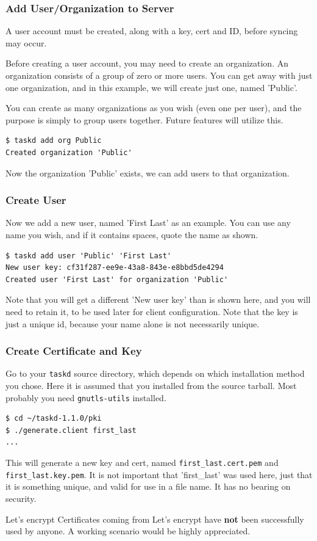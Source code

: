 \documentclass[t,handout]{beamer}
\begin{document}
\begin{frame}[fragile]\frametitle{Add User/Organization to Server}

    A user account must be created, along with a key, cert and ID, before syncing may occur.

    Before creating a user account, you may need to create an organization. An organization consists of a group of zero or more users. You can get away with just one organization, and in this example, we will create just one, named 'Public'.

    You can create as many organizations as you wish (even one per user), and the purpose is simply to group users together. Future features will utilize this.

    \begin{lstlisting}
$ taskd add org Public
Created organization 'Public'\end{lstlisting}

  Now the organization 'Public' exists, we can add users to that organization.
\end{frame}

\begin{frame}[fragile]\frametitle{Create User}
    \vfill
    Now we add a new user, named 'First Last' as an example.  You can use any name you wish, and if it contains spaces, quote the name as shown.

    \begin{lstlisting}
$ taskd add user 'Public' 'First Last'
New user key: cf31f287-ee9e-43a8-843e-e8bbd5de4294
Created user 'First Last' for organization 'Public'\end{lstlisting}

    Note that you will get a different 'New user key' than is shown here, and you will need to retain it, to be used later for client configuration.  Note that the key is just a unique id, because your name alone is not necessarily unique.
\end{frame}

\begin{frame}[fragile]\frametitle{Create Certificate and Key}
    Go to your \verb+taskd+ source directory, which depends on which installation method you chose. Here it is assumed that you installed from the source tarball. Most probably you need \verb+gnutls-utils+ installed.

    \begin{lstlisting}
$ cd ~/taskd-1.1.0/pki
$ ./generate.client first_last
...\end{lstlisting}

    This will generate a new key and cert, named \verb+first_last.cert.pem+ and \verb+first_last.key.pem+. It is not important that 'first\_last' was used here, just that it is something unique, and valid for use in a file name. It has no bearing on security.

    \begin{alertblock}{Let's encrypt}
        Certificates coming from Let's encrypt have \textbf{not} been successfully used by anyone. A working scenario would be highly appreciated.
    \end{alertblock}
\end{frame}
\end{document}

